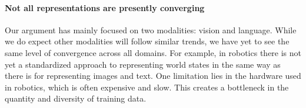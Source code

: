 \documentclass{article}
\theoremstyle{plain}
\theoremstyle{definition}
\theoremstyle{remark}
\begin{document}
\paragraph{Not all representations are presently converging}

Our argument has mainly focused on two modalities: vision and language. While we do expect other modalities will follow similar trends, we have yet to see the same level of convergence across all domains. For example, in robotics there is not yet a standardized approach to representing world states in the same way as there is for representing images and text. One limitation lies in the hardware used in robotics, which is often expensive and slow. This creates a bottleneck in the quantity and diversity of training data.





\end{document}

